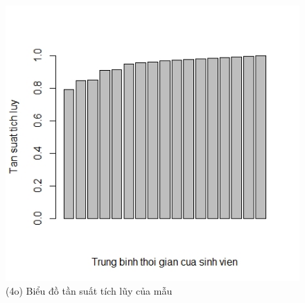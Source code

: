 \documentclass[a4paper]{article}
\theoremstyle{definition}
\begin{document}
\newpage
\begin{figure}[!ht]
    \centering
    \includegraphics[scale=0.4]{Pics/q4o-file2.jpeg}
    \caption{(4o) Biểu đồ tần suất tích lũy của mẫu }
    \label{fig:my_label}
\end{figure}
\end{document}
